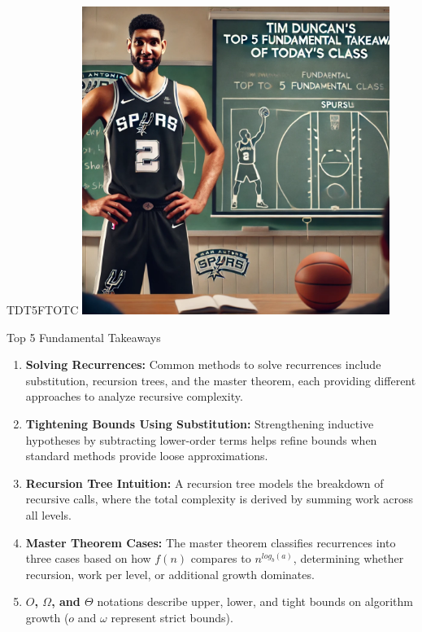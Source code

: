 \documentclass{beamer}
\begin{document}
\begin{frame}{TDT5FTOTC}
    \centering
    \includegraphics[width=0.75\textwidth]{figures/tim.png}
\end{frame}

\begin{frame}{Top 5 Fundamental Takeaways}
    \small
    \begin{enumerate} \pause
        \item[5] \textbf{Solving Recurrences:} Common methods to solve recurrences include substitution, recursion trees, and the master theorem, each providing different approaches to analyze recursive complexity. \pause

        \item[4] \textbf{Tightening Bounds Using Substitution:} Strengthening inductive hypotheses by subtracting lower-order terms helps refine bounds when standard methods provide loose approximations. \pause

        \item[3] \textbf{Recursion Tree Intuition:} A recursion tree models the breakdown of recursive calls, where the total complexity is derived by summing work across all levels. \pause

        \item[2] \textbf{Master Theorem Cases:} The master theorem classifies recurrences into three cases based on how $f(n)$ compares to $n^{log_b(a)}$, determining whether recursion, work per level, or additional growth dominates. \pause

        \item[1] \textbf{$O$, $\Omega$, and $\Theta$} notations describe upper, lower, and tight bounds on algorithm growth ($o$ and $\omega$ represent strict bounds).

    \end{enumerate}
\end{frame}
\end{document}
